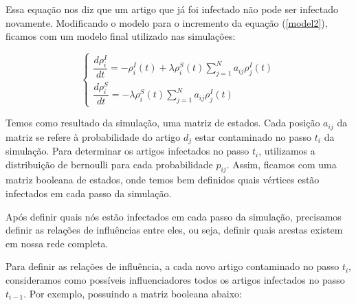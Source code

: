\documentclass[a4paper,12pt]{article}
\begin{document}
\begin{description}
    Essa equação nos diz que um artigo que já foi infectado não pode ser infectado novamente. Modificando o modelo para o incremento
    da equação (\ref{model2}), ficamos com um modelo final utilizado nas simulações:
    
   
    \begin{equation}
      \begin{cases}
	\dfrac{d\rho^{I}_{i}}{dt} = -\rho^{I}_{i}(t) + \lambda\rho_{i}^{S}(t) \sum_{j=1}^{N} a_{ij}\rho_{j}^{I}(t) \\[0.5cm]
	\dfrac{d\rho^{S}_{i}}{dt} = - \lambda\rho_{i}^{S}(t) \sum_{j=1}^{N} a_{ij}\rho_{j}^{I}(t)
      \end{cases}
    \end{equation}
 \end{description}

 \vspace{0.3cm}
  
Temos como resultado da simulação, uma matriz de estados. Cada posição $a_{ij}$ da matriz se refere à probabilidade do artigo
$d_{j}$ estar contaminado no passo $t_{i}$ da simulação. Para determinar os artigos infectados no passo $t_{i}$, utilizamos a distribuição
de bernoulli para cada probabilidade $p_{ij}$. Assim, ficamos com uma matriz booleana de estados, onde temos bem definidos quais
vértices estão infectados em cada passo da simulação.

Após definir quais nós estão infectados em cada passo da simulação, precisamos definir as relações de influências entre eles, ou seja,
definir quais arestas existem em nossa rede completa.

Para definir as relações de influência, a cada novo artigo contaminado no passo $t_{i}$, consideramos como possíveis influenciadores todos os artigos
infectados no passo $t_{i-1}$. Por exemplo, possuindo a matriz booleana abaixo:
\end{document}
